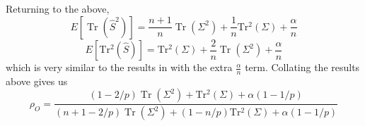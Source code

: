\documentclass[10pt,twoside,titlepage]{article}   %
\begin{document}
Returning to the above,
\begin{equation}
E \left[ \operatorname{Tr}(\hat{S}^2)\right] = \frac{n+1}{n} \operatorname{Tr}(\Sigma^2) + \frac{1}{n} \operatorname{Tr^2}(\Sigma) + \frac{\alpha}{n}
\end{equation}
\begin{equation}
E \left[ \operatorname{Tr^2}(\hat{S})\right] = \operatorname{Tr^2}(\Sigma) + \frac{2}{n} \operatorname{Tr}(\Sigma^2) + \frac{\alpha}{n}
\end{equation}
which is very similar to the results in \cite{OAS} with the extra $\frac{\alpha}{n}$ term.
Collating the results above gives us
\begin{equation}
\label{opt_rho}
\rho_O = \frac{ (1-2/p) \operatorname{Tr}(\Sigma^2) + \operatorname{Tr^2}(\Sigma) + \alpha (1 - 1/p) }{ (n+1-2/p) \operatorname{Tr}(\Sigma^2) + (1 - n/p) \operatorname{Tr^2}(\Sigma) + \alpha (1 - 1/p) }
\end{equation}
\end{document}
